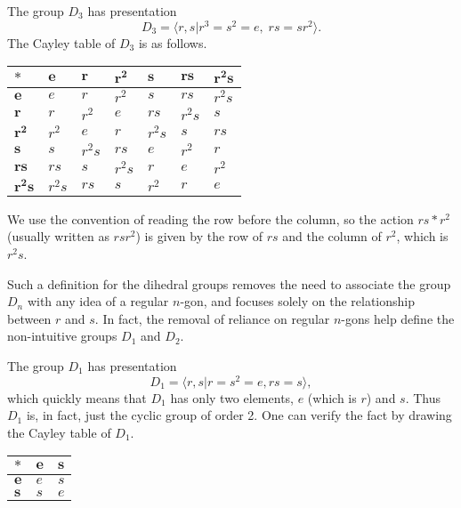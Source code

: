 \begin{example}\label{example-presentation-of-D3}
    The group $D_3$ has presentation
    \[
        D_3 = \langle r, s \vert r^3 = s^2 = e,\;rs = sr^2 \rangle.
    \]
    The Cayley table of $D_3$ is as follows.

    \begin{table}[H]
        \centering
        \begin{tabular}{|l|l|l|l|l|l|l|}
        \hline
        $\boldsymbol{\ast}$ & $\boldsymbol{e}$ & $\boldsymbol{r}$ & $\boldsymbol{r^2}$ & $\boldsymbol{s}$ & $\boldsymbol{rs}$ & $\boldsymbol{r^2s}$ \\ \hline
        $\boldsymbol{e}$ & $e$ & $r$ & $r^2$ & $s$ & $rs$ & $r^2s$ \\ \hline
        $\boldsymbol{r}$ & $r$ & $r^2$ & $e$ & $rs$ & $r^2s$ & $s$ \\ \hline
        $\boldsymbol{r^2}$ & $r^2$ & $e$ & $r$ & $r^2s$ & $s$ & $rs$ \\ \hline
        $\boldsymbol{s}$ & $s$ & $r^2s$ & $rs$ & $e$ & $r^2$ & $r$ \\ \hline
        $\boldsymbol{rs}$ & $rs$ & $s$ & $r^2s$ & $r$ & $e$ & $r^2$ \\ \hline
        $\boldsymbol{r^2s}$ & $r^2s$ & $rs$ & $s$ & $r^2$ & $r$ & $e$ \\ \hline
        \end{tabular}
    \end{table}

    We use the convention of reading the row before the column, so the action $rs \ast r^2$ (usually written as $rsr^2$) is given by the row of $rs$ and the column of $r^2$, which is $r^2s$.
\end{example}

Such a definition for the dihedral groups removes the need to associate the group $D_n$ with any idea of a regular $n$-gon, and focuses solely on the relationship between $r$ and $s$. In fact, the removal of reliance on regular $n$-gons help define the non-intuitive groups $D_1$ and $D_2$.
\begin{example}
    The group $D_1$ has presentation
    \[
        D_1 = \langle r, s \vert r = s^2 = e, rs = s \rangle,
    \]
    which quickly means that $D_1$ has only two elements, $e$ (which is $r$) and $s$. Thus $D_1$ is, in fact, just the cyclic group of order 2. One can verify the fact by drawing the Cayley table of $D_1$.

    \begin{table}[H]
        \centering
        \begin{tabular}{|l|l|l|}
            \hline
            $\boldsymbol{*}$ & $\boldsymbol{e}$ & $\boldsymbol{s}$ \\ \hline
            $\boldsymbol{e}$ & $e$ & $s$ \\ \hline
            $\boldsymbol{s}$ & $s$ & $e$ \\ \hline
        \end{tabular}
    \end{table}
\end{example}

